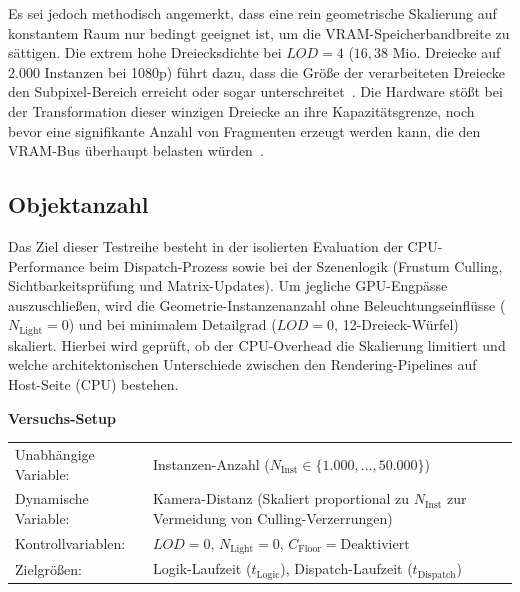 Es sei jedoch methodisch angemerkt, dass eine rein geometrische Skalierung auf konstantem Raum nur bedingt
geeignet ist, um die \ac{VRAM}-Speicherbandbreite zu sättigen.
Die extrem hohe Dreiecksdichte bei $LOD = 4$ ($16{,}38\text{ Mio.}$ Dreiecke auf $2.000$ Instanzen bei 1080p) führt
dazu, dass die Größe der verarbeiteten Dreiecke den Subpixel-Bereich erreicht oder sogar
unterschreitet~\parencite[vgl.][S.~1]{fatahalianReducingShadingGPUs2010}.
Die Hardware stößt bei der Transformation dieser winzigen Dreiecke an ihre Kapazitätsgrenze, noch bevor
eine signifikante Anzahl von Fragmenten erzeugt werden kann, die den \ac{VRAM}-Bus überhaupt belasten
würden~\parencites(vgl.)()[Kap.~18.2.3]{akenine-mollerRealtimeRendering2019}[Folie~\textit{Tiny triangles}]{Karis_Nanite_SIGGRAPH_Advances_2021_final}.

\subsection{{Objektanzahl}}
\label{subsec:050202_obejct_count_eval}

Das Ziel dieser Testreihe besteht in der isolierten Evaluation der \ac{CPU}-Performance beim Dispatch-Prozess sowie
bei der Szenenlogik (Frustum Culling, Sichtbarkeitsprüfung und Matrix-Updates).
Um jegliche \ac{GPU}-Engpässe auszuschließen, wird die Geometrie-In\-stan\-zen\-an\-zahl ohne Beleuchtungseinflüsse
($N_{\text{Light}} = 0$) und bei minimalem Detailgrad ($LOD = 0$, 12-Dreieck-Würfel) skaliert.
Hierbei wird geprüft, ob der \ac{CPU}-Overhead die Skalierung limitiert und welche architektonischen Unterschiede
zwischen den Rendering-Pipelines auf Host-Seite (\ac{CPU}) bestehen.

\begin{center}
    \small
    \colorbox{gray!5}{\parbox{0.95\textwidth}{
        \centering
        \vspace{2mm}
        {\sffamily\bfseries Versuchs-Setup} \\[1.5ex]
        \begin{tabularx}{0.9\textwidth}{>{\sffamily}l X}
            Unabhängige Variable:    & Instanzen-Anzahl ($N_{\text{Inst}} \in \{1.000, \dots, 50.000\}$) \\
            Dynamische Variable:     & Kamera-Distanz (Skaliert proportional zu $N_{\text{Inst}}$ zur Vermeidung von
            Culling-Verzerrungen) \\
            Kontrollvariablen:       & $LOD = 0$, $N_{\text{Light}} = 0$, $C_{\text{Floor}} =
            \text{Deaktiviert}$ \\
            Zielgrößen:              & Logik-Laufzeit ($t_{\text{Logic}}$), Dispatch-Laufzeit ($t_{\text{Dispatch}}$)
        \end{tabularx}
        \vspace{2mm}
    }}
\end{center}


